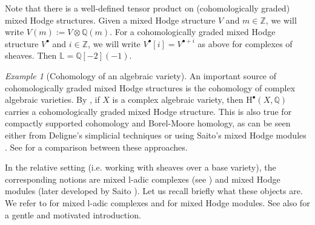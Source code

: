 \documentclass[11pt,english]{article}
\numberwithin{equation}{section}
\numberwithin{figure}{section}
\theoremstyle{definition}
\theoremstyle{plain}
\theoremstyle{remark}
\newtheorem{exmp}[df]{Example}
\newcommand\HH{\mathrm{H}}
\newcommand\ZZ{\mathbb{Z}}
\newcommand\QQ{\mathbb{Q}}
\begin{document}
Note that there is a well-defined tensor product on (cohomologically
graded) mixed Hodge structures. Given a mixed Hodge structure $V$
and $m\in\ZZ$, we will write $V(m):=V\otimes\QQ(m)$. For a cohomologically
graded mixed Hodge structure $V^{\bullet}$ and $i\in\ZZ$, we will
write $V^{\bullet}[i]=V^{\bullet+i}$ as above for complexes of sheaves.
Then $\mathbb{L}=\QQ[-2](-1)$.

\begin{exmp}[Cohomology of an algebraic variety]

An important source of cohomologically graded mixed Hodge structures
is the cohomology of complex algebraic varieties. By \cite{Del71,Del74a},
if $X$ is a complex algebraic variety, then $\HH^{\bullet}(X,\QQ)$
carries a cohomologically graded mixed Hodge structure. This is also
true for compactly supported cohomology and Borel-Moore homology,
as can be seen either from Deligne's simplicial techniques \cite[Ch. 5,6]{PS08}
or using Saito's mixed Hodge modules \cite[Ch. 14]{PS08}. See \cite[Rmk. 14.10.]{PS08}
for a comparison between these approaches.

\end{exmp}

In the relative setting (i.e. working with sheaves over a base variety),
the corresponding notions are mixed l-adic complexes (see \cite{Del80})
and mixed Hodge modules (later developed by Saito \cite{Sai88,Sai90}).
Let us recall briefly what these objects are. We refer to \cite[\S II.12.]{KW01}
for mixed l-adic complexes and \cite{Sai89}\cite[Ch. 14]{PS08} for
mixed Hodge modules. See also \cite{Sch14} for a gentle and motivated
introduction.
\end{document}
